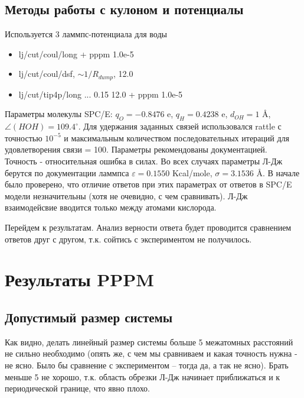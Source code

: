 \documentclass[a4paper,12pt]{article} %
\begin{document}
\subsection{Методы работы с кулоном и потенциалы}

Используется 3 ламмпс-потенциала для воды

\begin{itemize}
\item lj/cut/coul/long + pppm 1.0e-5
\item lj/cut/coul/dsf, $\sim 1/R_{dump}$, 12.0
\item lj/cut/tip4p/long ... 0.15 12.0 + pppm 1.0e-5
\end{itemize}

Параметры молекулы SPC/E: $q_O = -0.8476$ e, $q_H = 0.4238$ e, $d_{OH} = 1$ \AA, $\angle(HOH) = 109.4^{\circ}$. Для удержания заданных связей использовался rattle с точностью $10^{-5}$ и максимальным количеством последовательных итераций для удовлетворения связи = 100. Параметры рекомендованы документацией. Точность - относительная ошибка в силах.  Во всех случаях параметры Л-Дж берутся по документации ламмпса $\varepsilon = 0.1550$ Kcal/mole, $\sigma = 3.1536$ \AA. В начале было проверено, что отличие ответов при этих параметрах от ответов в SPC/E модели незначительны (хотя не очевидно, с чем сравнивать). Л-Дж взаимодейсвие вводится только между атомами кислорода.

Перейдем к результатам. Анализ верности ответа будет проводится сравнением ответов друг с другом, т.к. сойтись с экспериментом не получилось.

\section{Результаты PPPM}

\subsection{Допустимый размер системы}

Как видно, делать линейный размер системы больше 5 межатомных расстояний не сильно необходимо (опять же, с чем мы сравниваем и какая точность нужна - не ясно. Было бы сравнение с экспериментом -- тогда да, а так не ясно).  Брать меньше 5 не хорошо, т.к. область обрезки Л-Дж начинает приближаться и к периодической границе, что явно плохо.
\end{document}
